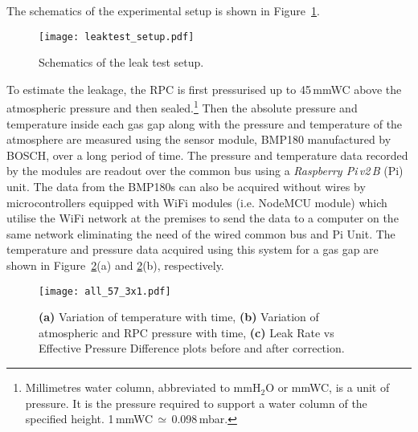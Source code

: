 The schematics of the experimental setup is shown in Figure~\ref{fig:schematics}.
\begin{figure}
  \centering
  \texttt{[image: leaktest\_setup.pdf]}
  \caption{Schematics of the leak test setup.}
  \label{fig:schematics}
\end{figure}
To estimate the leakage, the RPC is first pressurised up to 45\,mmWC above the atmospheric pressure and then sealed.\footnote{Millimetres water column, abbreviated to mmH$_2$O or mmWC, is a unit of pressure. It is the pressure required to support a water column of the specified height. 1\,mmWC\,$\simeq$\,0.098\,mbar.} Then the absolute pressure and temperature inside each gas gap along with the pressure and temperature of the atmosphere are measured using the sensor module, BMP180 manufactured by BOSCH\cite{bmp180}, over a long period of time. The pressure and temperature data recorded by the modules are readout over the common bus using a \textit{Raspberry Pi\,v2\,B} (Pi) unit\cite{rpi}. The data from the BMP180s can also be acquired without wires by microcontrollers equipped with WiFi modules (i.e. NodeMCU module\cite{nodemcu2015}) which utilise the WiFi network at the premises to send the data to a computer on the same network eliminating the need of the wired common bus and Pi Unit. The temperature and pressure data acquired using this system for a gas gap are shown in Figure~\ref{fig:temp}(a) and \ref{fig:temp}(b), respectively.
\begin{figure}[h!]
  \centering
  \texttt{[image: all\_57\_3x1.pdf]}
  \caption{\textbf{(a)} Variation of temperature with time, \textbf{(b)} Variation of atmospheric and RPC pressure with time, \textbf{(c)} Leak Rate vs Effective Pressure Difference plots before and after correction.}
  \label{fig:temp}
\end{figure}

